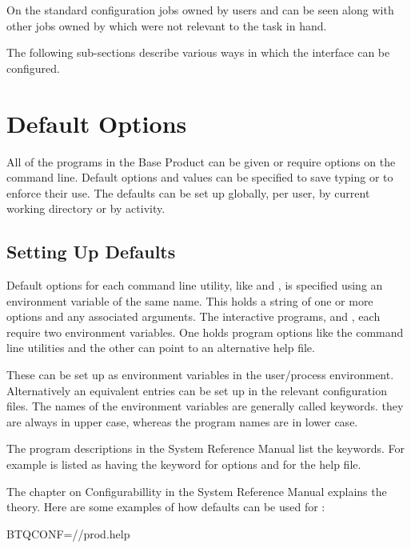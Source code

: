 On the standard configuration jobs owned by users  and  can be seen
along with other jobs owned by  which were not relevant to the
task in hand.

The following sub-sections describe various ways in which the interface can be configured.

\section{Default Options}
All of the programs in the Base Product can be given or require options
on the command line. Default options and values can be specified to
save typing or to enforce their use. The defaults can be set up
globally, per user, by current working directory or by activity.

\subsection{Setting Up Defaults}
Default options for each command line utility, like \PrBtr{} and \PrBtvar{}, is
specified using an environment variable of the same name. This holds a string of one or more options and any associated arguments. The
interactive programs, \PrBtq{} and \PrBtuser{}, each require two environment variables.
One holds program options like the command line utilities and the other can point to an alternative help file.

These can be set up as environment variables in the user/process environment. Alternatively an equivalent entries can be set up in the
relevant configuration files. The names of the environment variables are generally called keywords. they are always in upper case, whereas
the program names are in lower case. 

The program descriptions in the System Reference Manual list the keywords. For example \PrBtq{} is listed as having
the keyword \exampletext{\BtqVarname} for options and  for the help file.

The chapter on Configurabillity in the System Reference Manual explains the theory. Here are some examples of how defaults can be used for
\PrBtq{}:

\begin{expara}

BTQCONF=\helpdirname/\BtqName{}/prod.help

\end{expara}

